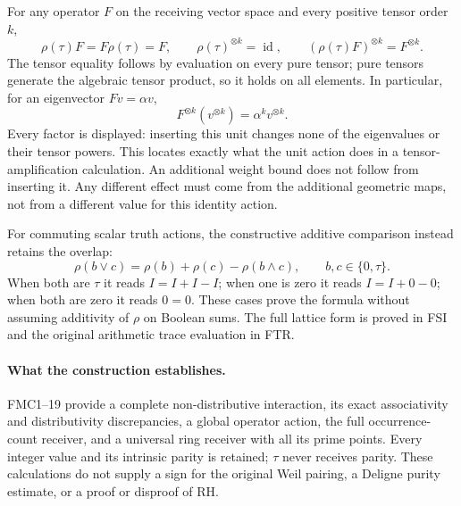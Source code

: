For any operator $F$ on the receiving vector space and every
positive tensor order $k$,
\begin{equation}\tag{FMC17}
\rho(\tau)F=F\rho(\tau)=F,\qquad
\rho(\tau)^{\otimes k}=\operatorname{id},\qquad
(\rho(\tau)F)^{\otimes k}=F^{\otimes k}.
\end{equation}
The tensor equality follows by evaluation on every pure tensor;
pure tensors generate the algebraic tensor product, so it holds
on all elements. In particular, for an eigenvector $Fv=\alpha v$,
\begin{equation}\tag{FMC18}
F^{\otimes k}(v^{\otimes k})=\alpha^k v^{\otimes k}.
\end{equation}
Every factor is displayed: inserting this unit changes none of
the eigenvalues or their tensor powers. This locates exactly
what the unit action does in a tensor-amplification calculation.
An additional weight bound does not follow from inserting it.
Any different effect must come from the additional geometric
maps, not from a different value for this identity action.

For commuting scalar truth actions, the constructive additive
comparison instead retains the overlap:
\begin{equation}\tag{FMC19}
\rho(b\vee c)=\rho(b)+\rho(c)-\rho(b\wedge c),
\qquad b,c\in\{0,\tau\}.
\end{equation}
When both are $\tau$ it reads $I=I+I-I$; when one is zero
it reads $I=I+0-0$; when both are zero it reads $0=0$.
These cases prove the formula without assuming additivity of
$\rho$ on Boolean sums. The full lattice form is proved in FSI
and the original arithmetic trace evaluation in FTR.

\paragraph{What the construction establishes.}
FMC1--19 provide a complete non-distributive interaction, its exact
associativity and distributivity discrepancies, a global operator
action, the full occurrence-count receiver, and a universal ring
receiver with all its prime points. Every integer value and its
intrinsic parity is retained; $\tau$ never receives parity. These
calculations do not supply a sign for the original Weil pairing,
a Deligne purity estimate, or a proof or disproof of RH.
